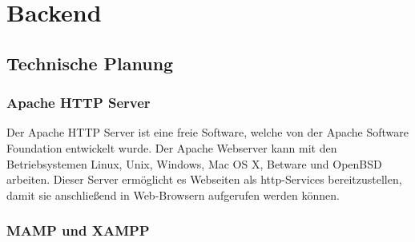 \section{Backend}

  \subsection{Technische Planung}

    \subsubsection{Apache HTTP Server}

Der {Apache HTTP Server\cite{apachehttpserver}} ist eine freie Software, welche von der Apache Software Foundation entwickelt wurde. Der Apache Webserver kann mit den Betriebsystemen Linux, Unix, Windows, Mac OS X, Betware und OpenBSD arbeiten. Dieser Server ermöglicht es Webseiten als http-Services bereitzustellen, damit sie anschließend in Web-Browsern aufgerufen werden können.

    \subsubsection{MAMP und XAMPP}

